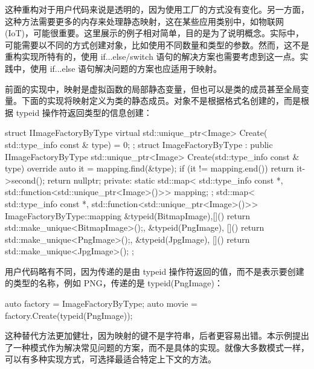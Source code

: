 这种重构对于用户代码来说是透明的，因为使用工厂的方式没有变化。另一方面，这种方法需要更多的内存来处理静态映射，这在某些应用类别中，如物联网(IoT)，可能很重要。这里展示的例子相对简单，目的是为了说明概念。实际中，可能需要以不同的方式创建对象，比如使用不同数量和类型的参数。然而，这不是重构实现所特有的，使用 if...else/switch 语句的解决方案也需要考虑到这一点。实践中，使用 if...else 语句解决问题的方案也应适用于映射。


前面的实现中，映射是虚拟函数的局部静态变量，但也可以是类的成员甚至全局变量。下面的实现将映射定义为类的静态成员。对象不是根据格式名创建的，而是根据 typeid 操作符返回类型的信息创建：

\begin{cpp}
struct IImageFactoryByType
{
    virtual std::unique_ptr<Image> Create(
    std::type_info const & type) = 0;
};
struct ImageFactoryByType : public IImageFactoryByType
{
    std::unique_ptr<Image> Create(std::type_info const & type)
    override
    {
        auto it = mapping.find(&type);
        if (it != mapping.end())
        return it->second();
        return nullptr;
    }
private:
    static std::map<
    std::type_info const *,
    std::function<std::unique_ptr<Image>()>> mapping;
};
std::map<
std::type_info const *,
std::function<std::unique_ptr<Image>()>> ImageFactoryByType::mapping
{
    {&typeid(BitmapImage),[](){
            return std::make_unique<BitmapImage>();}},
    {&typeid(PngImage),   [](){
            return std::make_unique<PngImage>();}},
    {&typeid(JpgImage),   [](){
            return std::make_unique<JpgImage>();}}
};
\end{cpp}

用户代码略有不同，因为传递的是由 typeid 操作符返回的值，而不是表示要创建的类型的名称，例如 PNG，传递的是 typeid(PngImage)：

\begin{cpp}
auto factory = ImageFactoryByType{};
auto movie = factory.Create(typeid(PngImage));
\end{cpp}

这种替代方法更加健壮，因为映射的键不是字符串，后者更容易出错。本示例提出了一种模式作为解决常见问题的方案，而不是具体的实现。就像大多数模式一样，可以有多种实现方式，可选择最适合特定上下文的方法。


